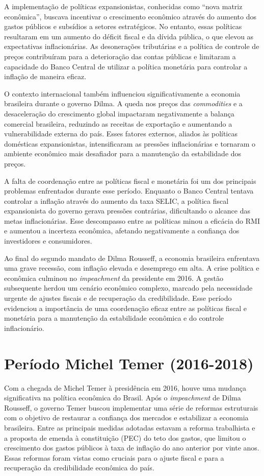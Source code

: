 \documentclass[12pt,oneside,a4paper,chapter=TITLE,english,brazil,sumario=abnt-6027-2012]{abntex2}
\begin{document}
A implementação de políticas expansionistas, conhecidas como ``nova matriz econômica'', buscava incentivar o crescimento econômico através do aumento dos gastos públicos e subsídios a setores estratégicos. No entanto, essas políticas resultaram em um aumento do déficit fiscal e da dívida pública, o que elevou as expectativas inflacionárias. As desonerações tributárias e a política de controle de preços contribuíram para a deterioração das contas públicas e limitaram a capacidade do Banco Central de utilizar a política monetária para controlar a inflação de maneira eficaz.

O contexto internacional também influenciou significativamente a economia brasileira durante o governo Dilma. A queda nos preços das \textit{commodities} e a desaceleração do crescimento global impactaram negativamente a balança comercial brasileira, reduzindo as receitas de exportação e aumentando a vulnerabilidade externa do país. Esses fatores externos, aliados às políticas domésticas expansionistas, intensificaram as pressões inflacionárias e tornaram o ambiente econômico mais desafiador para a manutenção da estabilidade dos preços.

A falta de coordenação entre as políticas fiscal e monetária foi um dos principais problemas enfrentados durante esse período. Enquanto o Banco Central tentava controlar a inflação através do aumento da taxa SELIC, a política fiscal expansionista do governo gerava pressões contrárias, dificultando o alcance das metas inflacionárias. Esse descompasso entre as políticas minou a eficácia do RMI e aumentou a incerteza econômica, afetando negativamente a confiança dos investidores e consumidores.

Ao final do segundo mandato de Dilma Rousseff, a economia brasileira enfrentava uma grave recessão, com inflação elevada e desemprego em alta. A crise política e econômica culminou no \textit{impeachment} da presidente em 2016. A gestão subsequente herdou um cenário econômico complexo, marcado pela necessidade urgente de ajustes fiscais e de recuperação da credibilidade. Esse período evidenciou a importância de uma coordenação eficaz entre as políticas fiscal e monetária para a manutenção da estabilidade econômica e do controle inflacionário.

\section{Período Michel Temer (2016-2018)}

Com a chegada de Michel Temer à presidência em 2016, houve uma mudança significativa na política econômica do Brasil. Após o \textit{impeachment} de Dilma Rousseff, o governo Temer buscou implementar uma série de reformas estruturais com o objetivo de restaurar a confiança dos mercados e estabilizar a economia brasileira. Entre as principais medidas adotadas estavam a reforma trabalhista e a  proposta de emenda à constituição (PEC) do teto dos gastos, que limitou o crescimento dos gastos públicos à taxa de inflação do ano anterior por vinte anos. Essas reformas foram vistas como cruciais para o ajuste fiscal e para a recuperação da credibilidade econômica do país.
\end{document}
